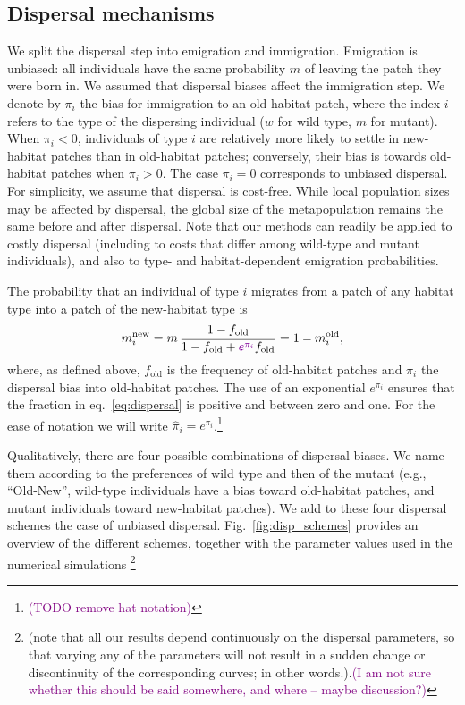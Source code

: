 \documentclass[a4paper,11pt]{article}
\newcommand{\florence}[1]{\textcolor{purple}{(#1)}} %
\newcommand{\chg}[1]{\textcolor{change}{#1}}
\begin{document}
\subsection*{Dispersal mechanisms}

We split the dispersal step into emigration and immigration. Emigration is unbiased: all individuals have the same probability $m$ of leaving the patch they were born in. We assumed that dispersal biases affect the immigration step. 
We denote by $\pi_{i}$ the bias for immigration to an old-habitat patch, where the index $i$ refers to the type of the dispersing individual ($w$ for wild type, $m$ for mutant). When $\pi_i<0$, individuals of type $i$ are relatively more likely to settle in new-habitat patches than in old-habitat patches; conversely, their bias is towards old-habitat patches when $\pi_i>0$. The case $\pi_i=0$ corresponds to unbiased dispersal. 
For simplicity, we assume that dispersal is cost-free. While local population sizes may be affected by dispersal, the global size of the metapopulation remains the same before and after dispersal.  Note that our methods can readily be applied to costly dispersal (including to costs that differ among wild-type and mutant individuals), and also to type- and habitat-dependent emigration probabilities. 

The probability that an individual of type $i$ migrates from a patch of any habitat type into a patch of the new-habitat type is
%
\begin{equation}\label{eq:dispersal}
\begin{aligned}
m_i^{\text{new}} &= m\, \frac{1-f_{\text{old}}}{1-f_{\text{old}}+\chg{e^{\pi_i}} f_{\text{old}}} = 1-m_i^{\text{old}},\\
\end{aligned}
\end{equation}
where, as defined above, $f_{\text{old}}$ is the frequency of old-habitat patches and $\pi_i$ the dispersal bias into old-habitat patches. The use of an exponential $e^{\pi_i}$  ensures that the fraction in eq.~\eqref{eq:dispersal} is positive and between zero and one. For the ease of notation we will write $\widehat{\pi}_i=e^{\pi_i}$.\footnote{\florence{TODO remove hat notation}}

Qualitatively, there are four possible combinations of dispersal biases. We name them according to the preferences of wild type and then of the mutant (e.g., ``Old-New'', wild-type individuals have a bias toward old-habitat patches, and mutant individuals toward new-habitat patches). We add to these four dispersal schemes the case of unbiased dispersal. Fig.~\ref{fig:disp_schemes} provides an overview of the different schemes, together with the parameter values used in the numerical simulations \footnote{(note that all our results depend continuously on the dispersal parameters, so that varying any of the parameters will not result in a sudden change or discontinuity of the corresponding curves; in other words.).\florence{I am not sure whether this should be said somewhere, and where -- maybe discussion?}} 
\end{document}

